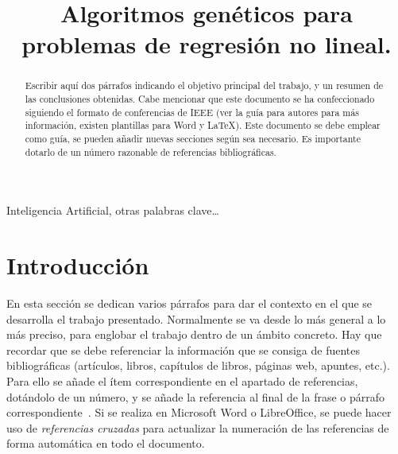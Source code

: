 \documentclass[conference,a4paper]{IEEEtran}
\begin{document}
\title{Algoritmos genéticos para problemas de regresión no lineal.}

\author{
  
  \and
  
}

\maketitle


\begin{abstract}
  Escribir aquí dos párrafos indicando el objetivo principal del trabajo, y un
  resumen de las conclusiones obtenidas. Cabe mencionar que este documento se
  ha confeccionado siguiendo el formato de conferencias de IEEE (ver la guía
  para autores para más información, existen plantillas para Word y \LaTeX).
  Este documento se debe emplear como guía, se pueden añadir nuevas secciones
  según sea necesario. Es importante dotarlo de un número razonable de
  referencias bibliográficas.
\end{abstract}


\begin{IEEEkeywords}
  Inteligencia Artificial, otras palabras clave…
\end{IEEEkeywords}


\section{Introducción}

En esta sección se dedican varios párrafos para dar el contexto en el que se
desarrolla el trabajo presentado. Normalmente se va desde lo más general a lo
más preciso, para englobar el trabajo dentro de un ámbito concreto. Hay que
recordar que se debe referenciar la información que se consiga de fuentes
bibliográficas (artículos, libros, capítulos de libros, páginas web, apuntes,
etc.). Para ello se añade el ítem correspondiente en el apartado de
referencias, dotándolo de un número, y se añade la referencia al final de la
frase o párrafo correspondiente~\cite{b1}. Si se realiza en Microsoft Word o
LibreOffice, se puede hacer uso de \emph{referencias cruzadas} para actualizar
la numeración de las referencias de forma automática en todo el documento.
\end{document}

